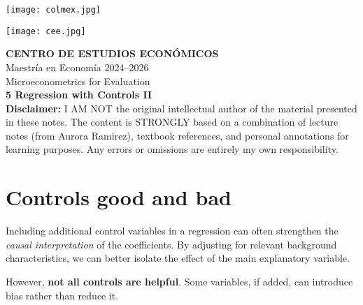 \documentclass[12pt]{article}
\title{}
\author{}
\date{}
\begin{document}
\begin{titlepage}
    \vspace*{-1cm}
    \noindent
    \begin{minipage}[t]{0.49\textwidth}
        \texttt{[image: colmex.jpg]}
    \end{minipage}%
    \begin{minipage}[t]{0.49\textwidth}
        \raggedleft
        \texttt{[image: cee.jpg]}
    \end{minipage}

    \vspace*{2cm}

    \begin{center}
        \Huge \textbf{CENTRO DE ESTUDIOS ECONÓMICOS} \\[1.5em]
        \Large Maestría en Economía 2024--2026 \\[2em]
        \Large Microeconometrics for Evaluation \\[3em]
        \LARGE \textbf{5 Regression with Controls II} \\[3em]
        \large \textbf{Disclaimer:} I AM NOT the original intellectual author of the material presented in these notes. The content is STRONGLY based on a combination of lecture notes (from Aurora Ramirez), textbook references, and personal annotations for learning purposes. Any errors or omissions are entirely my own responsibility.\\[0.9em]
        
    \end{center}

    \vfill
\end{titlepage}

\newpage

\setcounter{secnumdepth}{2}
\setcounter{tocdepth}{4}
\tableofcontents

\newpage

\section*{\noindent\textbf{Controls good and bad}}

\doublespacing
Including additional control variables in a regression can often strengthen the \textit{causal interpretation} of the coefficients. By adjusting for relevant background characteristics, we can better isolate the effect of the main explanatory variable.

However, \textbf{not all controls are helpful}. Some variables, if added, can introduce bias rather than reduce it.
\end{document}
